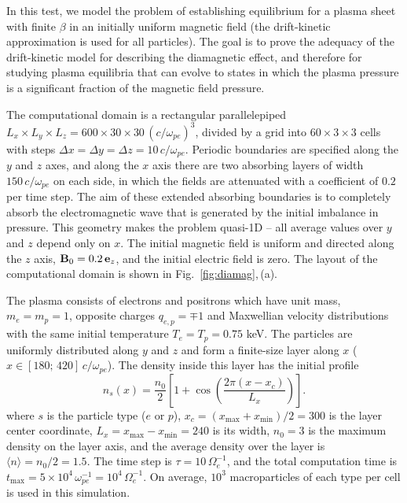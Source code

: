 \documentclass[final,3p]{elsarticle}
\begin{document}
In this test, we model the problem of establishing equilibrium for a plasma sheet with finite $\beta$ in an initially uniform magnetic field (the drift-kinetic approximation is used for all particles). The goal is to prove the adequacy of the drift-kinetic model for describing the diamagnetic effect, and therefore for studying plasma equilibria that can evolve to states in which the plasma pressure is a significant fraction of the magnetic field pressure.

The computational domain is a rectangular parallelepiped $L_x\times L_y\times L_z=600\times30\times30\,(c/\omega_{pe})^3$, divided by a grid into $60\times3\times3$ cells with steps $\Delta x=\Delta y=\Delta z=10\,c/\omega_{pe}$. Periodic boundaries are specified along the $y$ and $z$ axes, and along the $x$ axis there are two absorbing layers of width $150\,c/\omega_{pe}$ on each side, in which the fields are attenuated with a coefficient of $0.2$ per time step. The aim of these extended absorbing boundaries is to completely absorb the electromagnetic wave that is generated by the initial imbalance in pressure.  This geometry makes the problem quasi-1D -- all average values over $y$ and $z$ depend only on $x$. The initial magnetic field is uniform and directed along the $z$ axis, ${\bf B}_0=0.2\,{\bf e}_z$, and the initial electric field is zero. The layout of the computational domain is shown in Fig.~\ref{fig:diamag},\,(a).

The plasma consists of electrons and positrons which have unit mass, $m_e=m_p=1$, opposite charges $q_{e,p}=\mp1$ and Maxwellian velocity distributions with the same initial temperature $T_e=T_p=0.75$ keV. The particles are uniformly distributed along $y$ and $z$ and form a finite-size layer along $x$ ($x\in[180;\,420]\,c/\omega_{pe}$). The density inside this layer has the initial profile
\begin{equation}\label{cosine_hump_1d}
    n_s(x)=\frac{n_0}{2}\left[1+\cos\!\left(\frac{2\pi(x-x_c)}{L_x}\right)\right].
\end{equation}
where $s$ is the particle type ($e$ or $p$), $x_c=(x_{\max}+x_{\min})/2=300$ is the layer center coordinate, $L_x=x_{\max}-x_{\min}=240$ is its width, $n_0=3$ is the maximum density on the layer axis, and the average density over the layer is $\langle n\rangle=n_0/2=1.5$. The time step is $\tau=10\,\Omega_e^{-1}$, and the total computation time is $t_{\max}=5\times10^4\,\omega_{pe}^{-1}=10^4\,\Omega_e^{-1}$.
On average, $10^3$ macroparticles of each type per cell is used in this simulation. 
\end{document}
